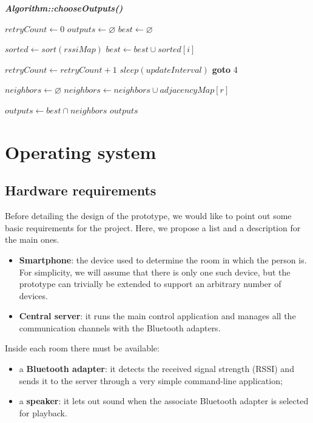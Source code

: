 \documentclass[conference]{IEEEtran}
\begin{document}
\vspace{2mm}
\textbf{\textit{Algorithm::chooseOutputs()}}
\begin{algorithmic}[1]
\STATE $retryCount \gets 0$
\STATE $outputs \gets \varnothing$
\STATE $best \gets \varnothing$

\STATE $sorted \gets sort(rssiMap)$
	\STATE $best \gets best \cup sorted[i]$
\ENDFOR

	\STATE $retryCount \gets retryCount + 1$
	\STATE $sleep(updateInterval)$
	\STATE \textbf{goto} 4
\ENDIF

\STATE $neighbors \gets \varnothing$
	\STATE $neighbors \gets neighbors \cup adjacencyMap[r]$
\ENDFOR

\STATE $outputs \gets best \cap neighbors$
\RETURN $outputs$
\end{algorithmic}


\section{Operating system} %

\subsection{Hardware requirements}
\label{hardware-requirements}
Before detailing the design of the prototype, we would like to point out some basic requirements for the project. Here, we propose a list and a description for the main ones.
\begin{itemize}
	\item{\textbf{Smartphone}:} the device used to determine the room in which the person is. For simplicity, we will assume that there is only one such device, but the prototype can trivially be extended to support an arbitrary number of devices.
	\item{\textbf{Central server}:} it runs the main control application and manages all the communication channels with the Bluetooth adapters.
\end{itemize}
Inside each room there must be available:
\begin{itemize}
	\item{a \textbf{Bluetooth adapter}:} it detects the received signal strength (RSSI) and sends it to the server through a very simple command-line application;
	\item{a \textbf{speaker}:} it lets out sound when the associate Bluetooth adapter is selected for playback.
\end{itemize}
\end{document}
